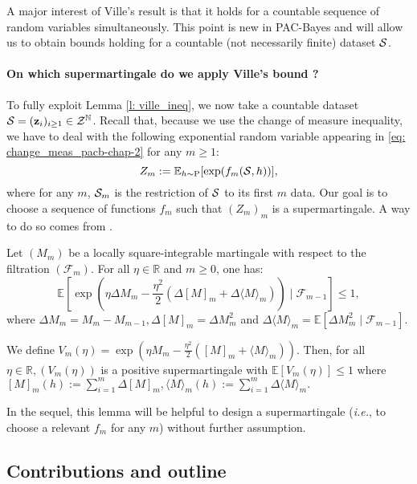 A major interest of Ville's result is that it holds for a countable sequence of random variables simultaneously. This point is new in PAC-Bayes and will allow us to obtain bounds holding for a countable (not necessarily finite) dataset $\S$.

\paragraph{On which supermartingale do we apply Ville's bound ?}

To fully exploit Lemma \ref{l: ville_ineq}, we now take a countable dataset $\S= (\z_i)_{i\geq 1}\in\mathcal{Z}^{\Nbb}$.
Recall that, because we use the change of measure inequality, we have to deal with the following exponential random variable appearing in \cref{eq: change_meas_pacb-chap-2} for any $m\geq 1$:
\[ Z_m:= \mathbb{E}_{h\sim \P}[\exp(f_m(\S,h))],   \]
where for any $m$, $\Sm$ is the restriction of $\S$ to its first $m$ data.
Our goal is to choose a sequence of functions $f_m$ such that $(Z_m)_m$ is a supermartingale. A way to do so comes from \citet{bercu2008exponential}.
\begin{lemma}
\label{l: bercu_touati}
Let $\left(M_{m}\right)$ be a locally square-integrable martingale with respect to the filtration $(\mathcal{F}_m)$. For all $\eta \in \mathbb{R}$ and $m \geq 0$, one has:
$$\mathbb{E}\left[\exp \left(\eta \Delta M_{m}-\frac{\eta^{2}}{2}\left(\Delta[M]_{m}+\Delta\langle M\rangle_{m}\right)\right) \mid \mathcal{F}_{m-1}\right] \leq 1,
$$
where $\Delta M_{m}=M_{m}-M_{m-1}, \Delta[M]_{m}=\Delta M_{m}^{2}$ and $\Delta\langle M\rangle_{m}=\mathbb{E}\left[\Delta M_{m}^{2} \mid \mathcal{F}_{m-1}\right]$.

We define $
V_{m}(\eta)=\exp \left(\eta M_{m}-\frac{\eta^{2}}{2}\left([M]_{m}+\langle M\rangle_{m}\right)\right) .
$
Then, for all $\eta \in \mathbb{R},\left(V_{m}(\eta)\right)$ is a positive supermartingale with $\mathbb{E}\left[V_{m}(\eta)\right] \leq 1$ where $[M]_{m}(h):=\sum_{i=1}^m \Delta[M]_{m},
\langle M\rangle_{m}(h):=\sum_{i=1}^m\Delta\langle M\rangle_{m}.$
\end{lemma}
In the sequel, this lemma will be helpful to design a supermartingale (\emph{i.e.}, to choose a relevant $f_m$ for any $m$) without further assumption.

\subsection{Contributions and outline}

